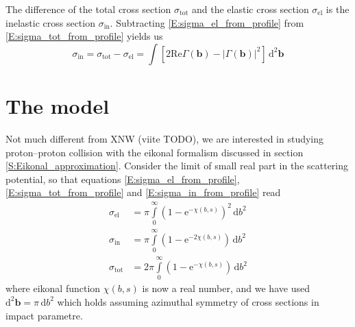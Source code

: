 \documentclass[a4paper, twoside, english, 12pt]{article}
\begin{document}
The difference of the total cross section $\sigma_\text{tot}$ and the elastic cross section $\sigma_\text{el}$ is the inelastic cross section $\sigma_\text{in}$. Subtracting \eqref{E:sigma_el_from_profile} from \eqref{E:sigma_tot_from_profile} yields us
\begin{equation}\label{E:sigma_in_from_profile}
	\sigma_\text{in} = \sigma_\text{tot} - \sigma_\text{el} = \int \left[ 2\text{Re}\Gamma(\mathbf{b}) - \left|\Gamma(\mathbf{b})\right|^2 \right] \,\text{d}^2\mathbf{b}
\end{equation}



\section{The model}\label{S:malli}


Not much different from XNW (viite TODO), we are interested in studying proton--proton collision with the eikonal formalism discussed in section \ref{S:Eikonal_approximation}. Consider the limit of small real part in the scattering potential, so that equations \eqref{E:sigma_el_from_profile}, \eqref{E:sigma_tot_from_profile} and \eqref{E:sigma_in_from_profile} read
\begin{align}
	\sigma_{\text{el}} &= \pi\int\limits_0^\infty \left(1-\text{e}^{-\chi(b,s)} \right)^2 \, \text{d}b^2 \label{E:sigma_el} \\[0.8em]
	\sigma_\text{in} &= \pi\int\limits_0^\infty \left(1-\text{e}^{-2\chi(b,s)} \right) \, \text{d}b^2 \label{E:sigma_in} \\[0.8em]
	\sigma_\text{tot} &= 2\pi\int\limits_0^\infty \left(1-\text{e}^{-\chi(b,s)} \right) \, \text{d}b^2 \label{E:sigma_tot}
\end{align}
where eikonal function $\chi(b,s)$ is now a real number, and we have used $\text{d}^2\mathbf{b} = \pi\,\text{d}b^2$ which holds assuming azimuthal symmetry of cross sections in impact parametre.
\end{document}
